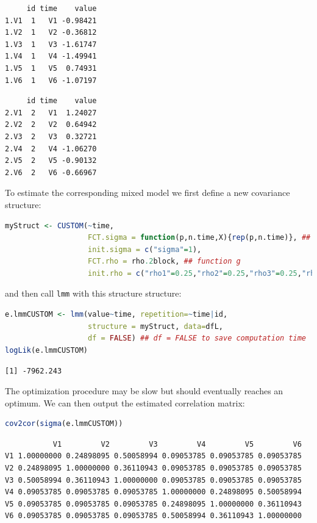 \documentclass[12pt]{article}
\begin{document}
\begin{minipage}{0.45\linewidth}
\label{}
\begin{verbatim}
     id time    value
1.V1  1   V1 -0.98421
1.V2  1   V2 -0.36812
1.V3  1   V3 -1.61747
1.V4  1   V4 -1.49941
1.V5  1   V5  0.74931
1.V6  1   V6 -1.07197
\end{verbatim}


\end{minipage}
\begin{minipage}{0.45\linewidth}
\label{}
\begin{verbatim}
     id time    value
2.V1  2   V1  1.24027
2.V2  2   V2  0.64942
2.V3  2   V3  0.32721
2.V4  2   V4 -1.06270
2.V5  2   V5 -0.90132
2.V6  2   V6 -0.66967
\end{verbatim}


\end{minipage}

\clearpage

To estimate the corresponding mixed model we first define a new
covariance structure:
\begin{lstlisting}[language=r,numbers=none]
myStruct <- CUSTOM(~time,
                   FCT.sigma = function(p,n.time,X){rep(p,n.time)}, ## function f
                   init.sigma = c("sigma"=1),
                   FCT.rho = rho.2block, ## function g
                   init.rho = c("rho1"=0.25,"rho2"=0.25,"rho3"=0.25,"rho4"=0.25))
\end{lstlisting}

and then call \texttt{lmm} with this structure structure:
\begin{lstlisting}[language=r,numbers=none]
e.lmmCUSTOM <- lmm(value~time, repetition=~time|id,
                   structure = myStruct, data=dfL,
                   df = FALSE) ## df = FALSE to save computation time
logLik(e.lmmCUSTOM)
\end{lstlisting}

\label{}
\begin{verbatim}
[1] -7962.243
\end{verbatim}


The optimization procedure may be slow but should eventually reaches
an optimum. We can then output the estimated correlation matrix:
\begin{lstlisting}[language=r,numbers=none]
cov2cor(sigma(e.lmmCUSTOM))
\end{lstlisting}

\label{}
\begin{verbatim}
           V1         V2         V3         V4         V5         V6
V1 1.00000000 0.24898095 0.50058994 0.09053785 0.09053785 0.09053785
V2 0.24898095 1.00000000 0.36110943 0.09053785 0.09053785 0.09053785
V3 0.50058994 0.36110943 1.00000000 0.09053785 0.09053785 0.09053785
V4 0.09053785 0.09053785 0.09053785 1.00000000 0.24898095 0.50058994
V5 0.09053785 0.09053785 0.09053785 0.24898095 1.00000000 0.36110943
V6 0.09053785 0.09053785 0.09053785 0.50058994 0.36110943 1.00000000
\end{verbatim}
\end{document}
